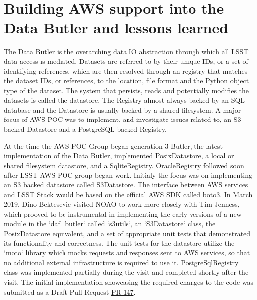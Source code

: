 \section{Building AWS support into the Data Butler and lessons learned}
\label{sec:butler}

The Data Butler is the overarching data IO abstraction through which all LSST data access is mediated. Datasets are referred to by their unique IDs, or a set of identifying references, which are then resolved through an registry that matches the dataset IDs, or references, to the location, file format and the Python object type of the dataset. The system that persists, reads and potentially modifies the datasets is called the datastore. The Registry almost always backed by an SQL database and the Datastore is usually backed by a shared filesystem. A major focus of AWS POC was to implement, and investigate issues related to, an S3 backed Datastore and a PostgreSQL backed Registry.

At the time the AWS POC Group began generation 3 Butler, the latest implementation of the Data Butler, implemented PosixDatastore, a local or shared filesystem datastore, and a SqliteRegistry. OracleRegistry followed soon after LSST AWS POC group began work. Initialy the focus was on implementing an S3 backed datastore called S3Datastore. The interface between AWS services and LSST Stack would be based on the official AWS SDK called boto3. In March 2019, Dino Bektesevic visited NOAO to work more closely with Tim Jenness, which prooved to be instrumental in implementing the early versions of a new module in the `daf\_butler` called `s3utils`, an `S3Datastore` class, the PosixDatastore equivalent, and a set of appropriate unit tests that demonstrated its functionality and correctness. The unit tests for the datastore utilize the `moto` library which mocks requests and responses sent to AWS services, so that no additional external infrastructure is required to use it. PostgreSqlRegistry class was implemented partially during the visit and completed shortly after the visit. The initial implementation showcasing the required changes to the code was submitted as a Draft Pull Request \href{https://github.com/lsst/daf_butler/pull/147}{PR-147}. 

